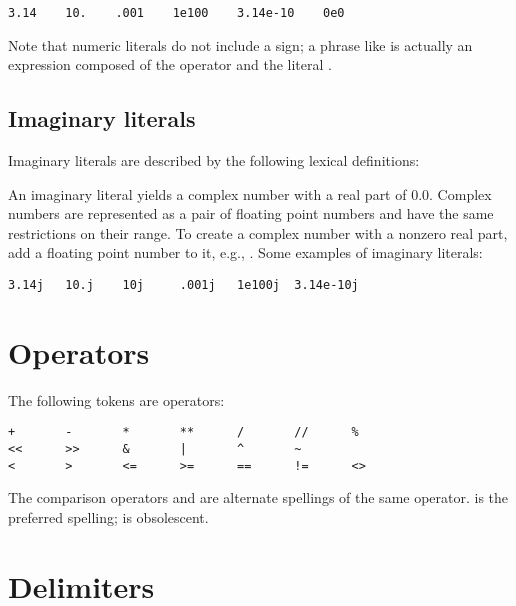 \begin{verbatim}
3.14    10.    .001    1e100    3.14e-10    0e0
\end{verbatim}

Note that numeric literals do not include a sign; a phrase like
 is actually an expression composed of the operator
\code{-} and the literal .


\subsection{Imaginary literals\label{imaginary}}

Imaginary literals are described by the following lexical definitions:

\begin{productionlist}
\end{productionlist}

An imaginary literal yields a complex number with a real part of
0.0.  Complex numbers are represented as a pair of floating point
numbers and have the same restrictions on their range.  To create a
complex number with a nonzero real part, add a floating point number
to it, e.g., .  Some examples of imaginary literals:

\begin{verbatim}
3.14j   10.j    10j     .001j   1e100j  3.14e-10j 
\end{verbatim}


\section{Operators\label{operators}}

The following tokens are operators:

\begin{verbatim}
+       -       *       **      /       //      %
<<      >>      &       |       ^       ~
<       >       <=      >=      ==      !=      <>
\end{verbatim}

The comparison operators \code{<>} and \code{!=} are alternate
spellings of the same operator.  \code{!=} is the preferred spelling;
\code{<>} is obsolescent.


\section{Delimiters\label{delimiters}}

